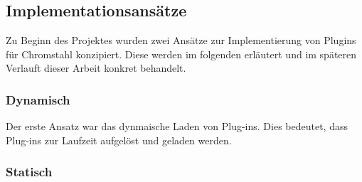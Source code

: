 \subsection{Implementationsansätze}
Zu Beginn des Projektes wurden zwei Ansätze zur Implementierung von Plugins für
Chromstahl konzipiert. Diese werden im folgenden erläutert und im späteren
Verlauft dieser Arbeit konkret behandelt.
\subsubsection{Dynamisch}
Der erste Ansatz war das dynmaische Laden von Plug-ins. Dies bedeutet, dass
Plug-ins zur Laufzeit aufgelöst und geladen werden. 
\subsubsection{Statisch}
